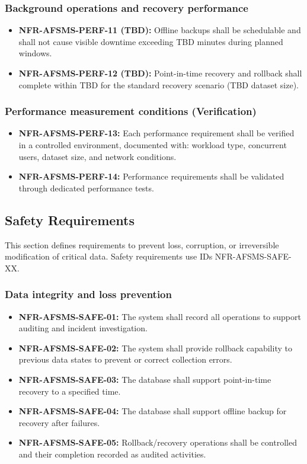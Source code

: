 \documentclass[11pt, a4paper]{article}
\begin{document}
\subsubsection{Background operations and recovery performance}
\begin{itemize}
    \item \textbf{NFR-AFSMS-PERF-11 (TBD):} Offline backups shall be schedulable and shall not cause visible downtime exceeding TBD minutes during planned windows.
    \item \textbf{NFR-AFSMS-PERF-12 (TBD):} Point-in-time recovery and rollback shall complete within TBD for the standard recovery scenario (TBD dataset size).
\end{itemize}

\subsubsection{Performance measurement conditions (Verification)}
\begin{itemize}
    \item \textbf{NFR-AFSMS-PERF-13:} Each performance requirement shall be verified in a controlled environment, documented with: workload type, concurrent users, dataset size, and network conditions.
    \item \textbf{NFR-AFSMS-PERF-14:} Performance requirements shall be validated through dedicated performance tests.
\end{itemize}

\subsection{Safety Requirements}
This section defines requirements to prevent loss, corruption, or irreversible modification of critical data. Safety requirements use IDs NFR-AFSMS-SAFE-XX.

\subsubsection{Data integrity and loss prevention}
\begin{itemize}
    \item \textbf{NFR-AFSMS-SAFE-01:} The system shall record all operations to support auditing and incident investigation.
    \item \textbf{NFR-AFSMS-SAFE-02:} The system shall provide rollback capability to previous data states to prevent or correct collection errors.
    \item \textbf{NFR-AFSMS-SAFE-03:} The database shall support point-in-time recovery to a specified time.
    \item \textbf{NFR-AFSMS-SAFE-04:} The database shall support offline backup for recovery after failures.
    \item \textbf{NFR-AFSMS-SAFE-05:} Rollback/recovery operations shall be controlled and their completion recorded as audited activities.
\end{itemize}
\end{document}
